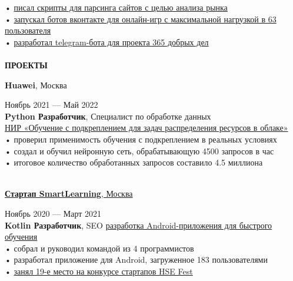 \documentclass{article}
\begin{document}
\begin{vwcol}[widths={0.8,0.2},
 sep=.8cm, justify=flush,rule=0pt,indent=1em]
• \href{https://github.com/NikPeg/OzonParsing}{писал скрипты для парсинга сайтов с целью анализа рынка}\\
• \href{https://github.com/NikPeg/ExtraterrestrialBot}{запускал ботов вконтакте для онлайн-игр с максимальной нагрузкой в 63 пользователя}\\
• \href{https://github.com/NikPeg/dobrobot365}{разработал telegram-бота для проекта 365 добрых дел}\\
\\
\noindent\textcolor[rgb]{0.1255,0.2902,0.7843}{\textbf{\Large{ПРОЕКТЫ}}}\\
\begin{Large}
\textbf{Huawei}, Москва
\end{Large}
\hspace{198pt}Ноябрь 2021 — Май 2022\\
\textbf{Python Разработчик}, Специалист по обработке данных\\
\href{https://github.com/NikPeg/Reinforcement-learning-for-resource-allocation-tasks-in-the-cloud}{НИР «Обучение с подкреплением для задач распределения ресурсов в облаке»}\\
• проверил применимость обучения с подкреплением в реальных условиях\\
• создал и обучил нейронную сеть, обрабатывающую 4500 запросов в час\\
• итоговое количество обработанных запросов составило 4.5 миллиона\\
\\
\begin{Large}
\href{https://www.canva.com/design/DAEaT9nPC7Y/y7_r2BzUEiUiFKW36oP-Pw/view?utm_content=DAEaT9nPC7Y&utm_campaign=designshare&utm_medium=link&utm_source=publishsharelink}{\textbf{Стартап SmartLearning}, Москва}
\end{Large}
\hspace{75pt}Ноябрь 2020 — Март 2021\\
\textbf{Kotlin Разработчик}, SEO \href{https://gitlab.com/peganov.nik/smartlearning}{разработка Android-приложения для быстрого обучения}\\
• собрал и руководил командой из 4 программистов\\
• разработал приложение для Android, загруженное 183 пользователями\\
• \href{https://fest.hse.ru/top1002021}{занял 19-е место на конкурсе стартапов HSE Fest}\\
\\
\begin{Large}

\end{Large}
\end{vwcol}
\end{document}
